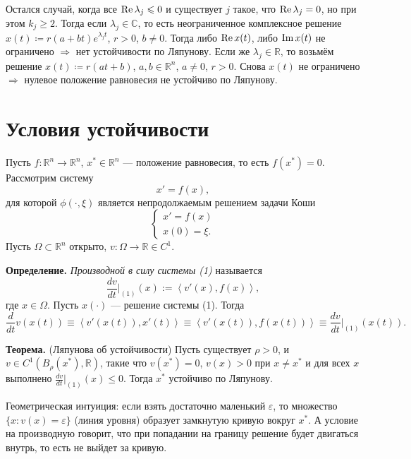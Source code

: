 \begin{enumerate}
Остался случай, когда все $\operatorname{Re} \lambda_j \leqslant 0$ и существует $j$ такое, что $\operatorname{Re} \lambda_j = 0$, но при этом $k_j \ge 2$. Тогда если $\lambda_j \in \mathbb C$, то есть неограниченное комплексное решение $x(t) \coloneq r(a+bt)e^{\lambda_jt}$, $r > 0$, $b \ne 0$. Тогда либо $\operatorname{Re} x(t)$, либо $\operatorname{Im} x(t)$ не ограничено $\Rightarrow$ нет устойчивости по Ляпунову.
Если же $\lambda_j \in \mathbb R$, то возьмём решение $x(t) \coloneq r(at + b)$, $a, b \in \mathbb R^n$, $a \ne 0$, $r > 0$. Снова $x(t)$ не ограничено $\Rightarrow$ нулевое положение равновесия не устойчиво по Ляпунову.
\end{enumerate}

\QED

\setcounter{equation}{0}
\section{Условия устойчивости}
Пусть $f: \mathbb R^n \to \mathbb R^n$, $x^* \in \mathbb R^n$ --- положение равновесия, то есть $f(x^*) = 0$.
Рассмотрим систему
\begin{equation}
    x' = f(x),
\end{equation}
для которой $\phi(\cdot, \xi)$ является непродолжаемым решением задачи Коши
\[
    \begin{cases}
        x' = f(x) \\
        x(0) = \xi.
    \end{cases}
\]
Пусть $\Omega \subset \mathbb R^n$ открыто, $v: \Omega \to \mathbb R \in C^1$.

\textbf{Определение.} \textit{Производной в силу системы (1)} называется
\[
    \frac{dv}{dt} \bigg|_{(1)}(x) := \left< v'(x), f(x) \right>,
\]
где $x \in \Omega$.
Пусть $x(\cdot)$ --- решение системы (1). Тогда
\[
    \frac{d}{dt} v(x(t)) \equiv \left< v'(x(t)), x'(t) \right> \equiv \left< v'(x(t)), f(x(t)) \right> \equiv \frac{dv}{dt} \bigg|_{(1)}(x(t)).
\]

\textbf{Теорема.} (Ляпунова об устойчивости) Пусть существует $\rho > 0$, и $v \in C^1(B_{\rho}(x^*), \mathbb R)$, такие что $v(x^*) = 0$, $v(x) > 0$ при $x \ne x^*$ и для всех $x$ выполнено $\frac{dv}{dt} \big|_{(1)} (x) \le 0$.
Тогда $x^*$ устойчиво по Ляпунову.

Геометрическая интуиция: если взять достаточно маленький $\varepsilon$, то множество $\{x: v(x) = \varepsilon \}$ (линия уровня) образует замкнутую кривую вокруг $x^*$.
А условие на производную говорит, что при попадании на границу решение будет двигаться внутрь, то есть не выйдет за кривую.

